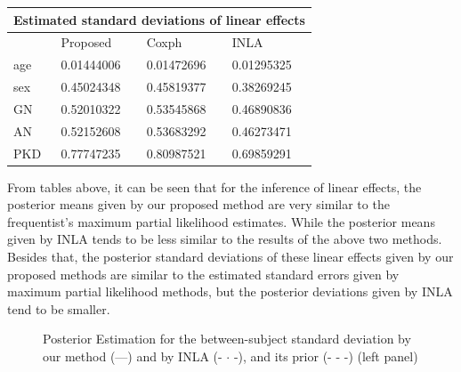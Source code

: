 \documentclass[]{article}
\begin{document}
\begin{tabular}{ |p{3cm}||p{3cm}|p{3cm}|p{3cm}|  }
 \hline
 \multicolumn{4}{|c|}{Estimated standard deviations of linear effects} \\
 \hline
 & Proposed & Coxph & INLA \\
 \hline
 age & 0.01444006 & 0.01472696 & 0.01295325\\
 sex & 0.45024348  & 0.45819377 & 0.38269245\\
 GN & 0.52010322 & 0.53545868 & 0.46890836\\
 AN & 0.52152608 & 0.53683292 & 0.46273471\\
 PKD & 0.77747235  & 0.80987521 & 0.69859291\\
 \hline
\end{tabular}


From tables above, it can be seen that for the inference of linear effects, the posterior means given by our proposed method are very similar to the frequentist's maximum partial likelihood estimates. While the posterior means given by INLA tends to be less similar to the results of the above two methods. Besides that, the posterior standard deviations of these linear effects given by our proposed methods are similar to the estimated standard errors given by maximum partial likelihood methods, but the posterior deviations given by INLA tend to be smaller.

\begin{figure}[ht]
\centering
{}
\caption{Posterior Estimation for the between-subject standard deviation by our method (---) and by INLA (- $\cdot$ -), and its prior (- - -)  (left panel)}
\label{fig:BetweenSubjectSD}
\end{figure}
\end{document}
